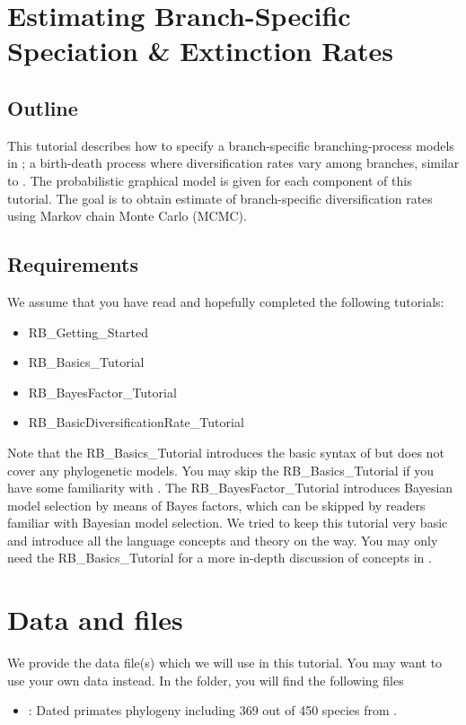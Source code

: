 \section{Estimating Branch-Specific Speciation \& Extinction Rates}

\subsection{Outline}

This tutorial describes how to specify a branch-specific branching-process models in \RevBayes;
a birth-death process where diversification rates vary among branches, similar to \cite{Rabosky2014a}.
The probabilistic graphical model is given for each component of this tutorial.
The goal is to obtain estimate of branch-specific diversification rates using Markov chain Monte Carlo (MCMC).


\subsection{Requirements}
We assume that you have read and hopefully completed the following tutorials:
\begin{itemize}
\item RB\_Getting\_Started
\item RB\_Basics\_Tutorial
\item RB\_BayesFactor\_Tutorial
\item RB\_BasicDiversificationRate\_Tutorial
\end{itemize}
Note that the RB\_Basics\_Tutorial introduces the basic syntax of \Rev but does not cover any phylogenetic models.
You may skip the RB\_Basics\_Tutorial if you have some familiarity with \R.
The RB\_BayesFactor\_Tutorial introduces Bayesian model selection by means of Bayes factors, which can be skipped by readers familiar with Bayesian model selection.
We tried to keep this tutorial very basic and introduce all the language concepts and theory on the way.
You may only need the RB\_Basics\_Tutorial for a more in-depth discussion of concepts in \Rev.



\section{Data and files}

We provide the data file(s) which we will use in this tutorial.
You may want to use your own data instead.
In the  folder, you will find the following files
\begin{itemize}
\item {}: Dated primates phylogeny including 369 out of 450 species from \cite{Springer2012}.
\end{itemize}


